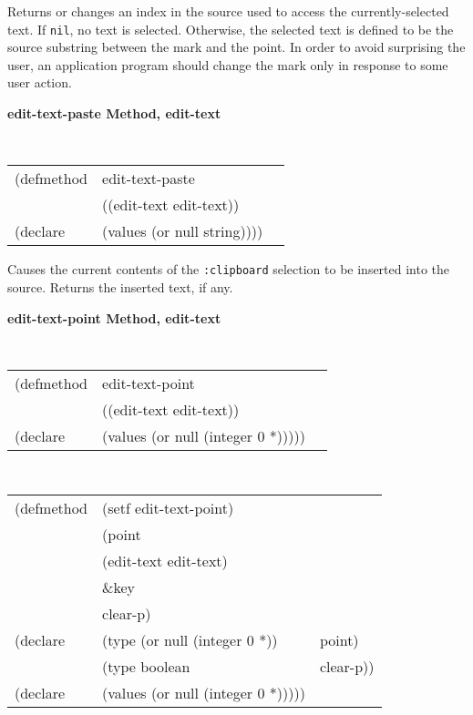 \begin{flushright} \parbox[t]{6.125in}{
Returns or changes an index in the
source used to access the currently-selected text. If {\tt nil}, no text is
selected. Otherwise, the selected text is defined to be the source substring
between the mark and the point. In order to
avoid surprising the user, an application program should change the mark only in
response to some user action.} 
\end{flushright}

{\samepage
{\large {\bf edit-text-paste \hfill Method, edit-text}}
\begin{flushright} \parbox[t]{6.125in}{
\tt
\begin{tabular}{lll}
\raggedright
(defmethod & edit-text-paste & \\
           & ((edit-text  edit-text)) \\
(declare   & (values (or null string))))
\end{tabular}
\rm

}\end{flushright}}

\begin{flushright} \parbox[t]{6.125in}{
Causes the current contents of the {\tt :clipboard} selection to be
inserted into the source.
Returns the inserted text, if any.

}\end{flushright}


        
{\samepage  
{\large {\bf edit-text-point \hfill Method, edit-text}}
\begin{flushright} \parbox[t]{6.125in}{
\tt
\begin{tabular}{lll}
\raggedright
(defmethod & edit-text-point & \\
& ((edit-text  edit-text)) \\
(declare & (values (or null (integer 0 *)))))
\end{tabular}
\rm

}\end{flushright}}

\begin{flushright} \parbox[t]{6.125in}{
\tt
\begin{tabular}{lll}
\raggedright
(defmethod & (setf edit-text-point) & \\
         & (point \\
         & (edit-text  edit-text)\\
         & \&key\\
         & clear-p) \\
(declare &(type (or null (integer 0 *)) & point)\\
         &(type boolean &  clear-p))\\
(declare & (values (or null (integer 0 *)))))
\end{tabular}
\rm}
\end{flushright}

